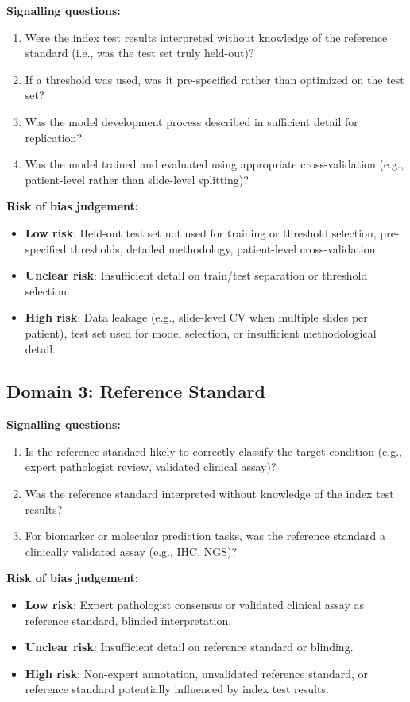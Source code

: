\textbf{Signalling questions:}
\begin{enumerate}
  \item Were the index test results interpreted without knowledge of the reference standard (i.e., was the test set truly held-out)?
  \item If a threshold was used, was it pre-specified rather than optimized on the test set?
  \item Was the model development process described in sufficient detail for replication?
  \item Was the model trained and evaluated using appropriate cross-validation (e.g., patient-level rather than slide-level splitting)?
\end{enumerate}

\textbf{Risk of bias judgement:}
\begin{itemize}
  \item \textbf{Low risk}: Held-out test set not used for training or threshold selection, pre-specified thresholds, detailed methodology, patient-level cross-validation.
  \item \textbf{Unclear risk}: Insufficient detail on train/test separation or threshold selection.
  \item \textbf{High risk}: Data leakage (e.g., slide-level CV when multiple slides per patient), test set used for model selection, or insufficient methodological detail.
\end{itemize}

\subsection*{Domain 3: Reference Standard}

\textbf{Signalling questions:}
\begin{enumerate}
  \item Is the reference standard likely to correctly classify the target condition (e.g., expert pathologist review, validated clinical assay)?
  \item Was the reference standard interpreted without knowledge of the index test results?
  \item For biomarker or molecular prediction tasks, was the reference standard a clinically validated assay (e.g., IHC, NGS)?
\end{enumerate}

\textbf{Risk of bias judgement:}
\begin{itemize}
  \item \textbf{Low risk}: Expert pathologist consensus or validated clinical assay as reference standard, blinded interpretation.
  \item \textbf{Unclear risk}: Insufficient detail on reference standard or blinding.
  \item \textbf{High risk}: Non-expert annotation, unvalidated reference standard, or reference standard potentially influenced by index test results.
\end{itemize}

